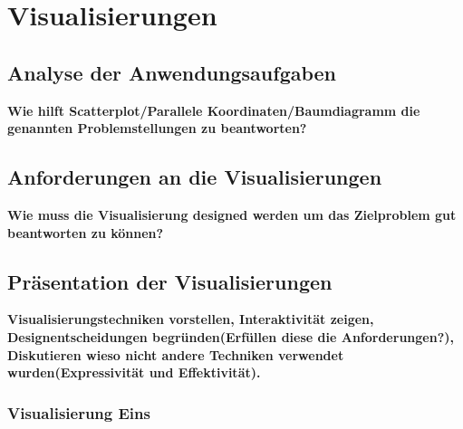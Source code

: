 \documentclass[usegeometry=true]{scrartcl}
\begin{document}
\section{Visualisierungen}
\subsection{Analyse der Anwendungsaufgaben}

\textbf{Wie hilft Scatterplot/Parallele Koordinaten/Baumdiagramm die genannten Problemstellungen zu beantworten?}
\subsection{Anforderungen an die Visualisierungen}
\textbf{Wie muss die Visualisierung designed werden um das Zielproblem gut beantworten zu können?}
\subsection{Präsentation der Visualisierungen}


\textbf{Visualisierungstechniken vorstellen, Interaktivität zeigen, Designentscheidungen begründen(Erfüllen diese die Anforderungen?), Diskutieren wieso nicht andere Techniken verwendet wurden(Expressivität und Effektivität).}
\subsubsection{Visualisierung Eins}
\end{document}
